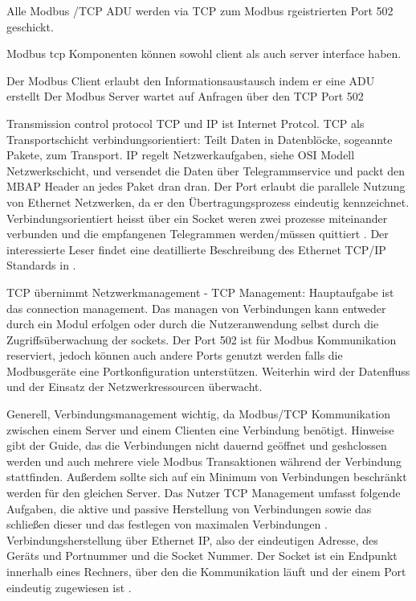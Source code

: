 Alle Modbus /TCP ADU werden via TCP zum Modbus rgeistrierten Port 502 geschickt.

Modbus tcp Komponenten können sowohl client als auch server interface haben. \cite[S.~7f.]{mod06tcp}

Der Modbus Client erlaubt den Informationsaustausch indem er eine ADU erstellt
Der Modbus Server wartet auf Anfragen über den TCP Port 502

Transmission control protocol TCP und IP ist Internet Protcol. TCP als Transportschicht verbindungsorientiert: Teilt Daten in Datenblöcke, sogeannte Pakete, zum Transport. IP regelt Netzwerkaufgaben, siehe OSI Modell Netzwerkschicht, und versendet die Daten über Telegrammservice und packt den MBAP Header an jedes Paket dran dran. Der Port erlaubt die parallele Nutzung von Ethernet Netzwerken, da er den Übertragungsprozess eindeutig kennzeichnet. Verbindungsorientiert heisst über ein Socket weren zwei prozesse miteinander verbunden und die empfangenen Telegrammen werden/müssen quittiert \cite[S.~16ff.]{schn06}. Der interessierte Leser findet eine deatillierte Beschreibung des Ethernet TCP/IP Standards in \cite{fu03}.


TCP übernimmt Netzwerkmanagement - TCP Management:
Hauptaufgabe ist das connection management. Das managen von Verbindungen kann entweder durch ein Modul erfolgen oder durch die Nutzeranwendung selbst durch die Zugriffsüberwachung der sockets. Der Port 502 ist für Modbus Kommunikation reserviert, jedoch können auch andere Ports genutzt werden falls die Modbusgeräte eine Portkonfiguration unterstützen. Weiterhin wird der Datenfluss und der Einsatz der Netzwerkressourcen überwacht. \cite[S.~7ff.]{mod06tcp}

Generell, Verbindungsmanagement wichtig, da Modbus/TCP Kommunikation zwischen einem Server und einem Clienten eine Verbindung benötigt.
Hinweise gibt der Guide, das die Verbindungen nicht dauernd geöffnet und geshclossen werden und auch mehrere viele Modbus Transaktionen während der Verbindung stattfinden. Außerdem sollte sich auf ein Minimum von Verbindungen beschränkt werden für den gleichen Server. \cite[S.~9f.]{mod06tcp}
Das Nutzer TCP Management umfasst folgende Aufgaben, die aktive und passive Herstellung von Verbindungen sowie das schließen dieser und das festlegen von maximalen Verbindungen \cite[S.~11ff.]{mod06tcp}. Verbindungsherstellung über Ethernet IP, also der eindeutigen Adresse, des Geräts und Portnummer und die Socket Nummer. Der Socket ist ein Endpunkt innerhalb eines Rechners, über den die Kommunikation läuft und der einem Port eindeutig zugewiesen ist \cite[S.~15f.]{mod06tcp} .

